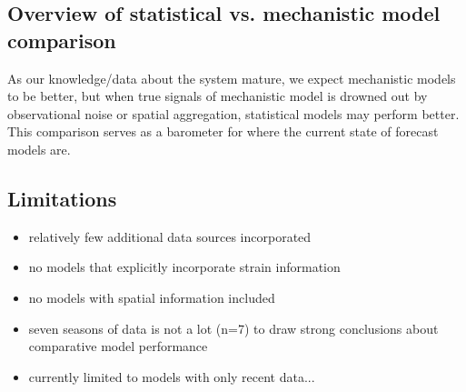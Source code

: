 \documentclass{article}\usepackage[]{graphicx}\usepackage[]{color}
\begin{document}
\subsection{Overview of statistical vs. mechanistic model comparison}
As our knowledge/data about the system mature, we expect mechanistic models to be better, but when true signals of mechanistic model is drowned out by observational noise or spatial aggregation, statistical models may perform better. This comparison serves as a barometer for where the current state of forecast models are.

\subsection{Limitations}

\begin{itemize}
    \item relatively few additional data sources incorporated
    \item no models that explicitly incorporate strain information
    \item no models with spatial information included
    \item seven seasons of data is not a lot (n=7) to draw strong conclusions about comparative model performance
    \item currently limited to models with only recent data...
\end{itemize}



\end{document}
